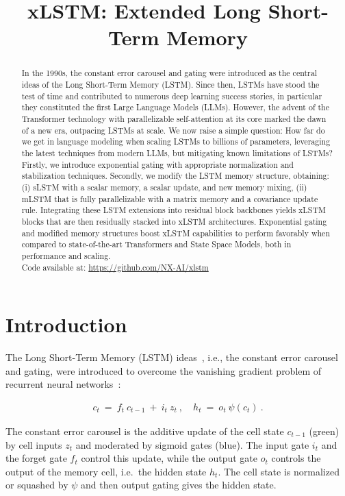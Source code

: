 \title{xLSTM: Extended Long Short-Term Memory}

\begin{abstract}
In the 1990s, the constant error carousel and gating were introduced as the central ideas of the Long Short-Term Memory (LSTM). Since then, LSTMs have stood the test of time and contributed to numerous deep learning success stories, in particular they constituted the first Large Language Models (LLMs). However, the advent of the Transformer technology with parallelizable self-attention at its core marked the dawn of a new era, outpacing LSTMs at scale. We now raise a simple question: How far do we get in language modeling when scaling LSTMs to billions of parameters, leveraging the latest techniques from modern LLMs, but mitigating known limitations of LSTMs? Firstly, we introduce exponential gating with appropriate normalization and stabilization techniques. Secondly, we modify the LSTM memory structure, obtaining: (i) sLSTM with a scalar memory, a scalar update, and new memory mixing, (ii) mLSTM that is fully parallelizable with a matrix memory and a covariance update rule. Integrating these LSTM extensions into residual block backbones yields xLSTM blocks that are then residually stacked into xLSTM architectures. Exponential gating and modified memory structures boost xLSTM capabilities to perform favorably when compared to state-of-the-art Transformers and State Space Models, both in performance and scaling.\\
Code available at: \url{https://github.com/NX-AI/xlstm}
\end{abstract}

\section{Introduction}
\label{sec:intro}

The Long Short-Term Memory (LSTM) ideas~\citep{Hochreiter:91,Hochreiter:97nips,Hochreiter:97}, i.e., the constant error carousel and gating, were introduced to overcome the vanishing gradient problem of recurrent neural networks~\citep{Hochreiter:91,Hochreiter:00book}:

\begin{align}
\label{eq:lstm_idea}
  c_t \ = \ f_t \ c_{t-1} \ + \ 
          i_t \  z_t \ , \quad  
          h_t \ = \ o_t \ \psi({c_t}) \ . 
\end{align}

The constant error carousel is the additive update of the cell state $c_{t-1}$ (green) by cell inputs $z_t$ and moderated by sigmoid gates (blue). The input gate $i_t$ and the forget gate $f_t$ control this update, while the output gate $o_t$ controls the output of the memory cell, 
i.e.\ the hidden state $h_t$. The cell state is normalized or squashed by $\psi$ 
and then output gating gives the hidden state.

